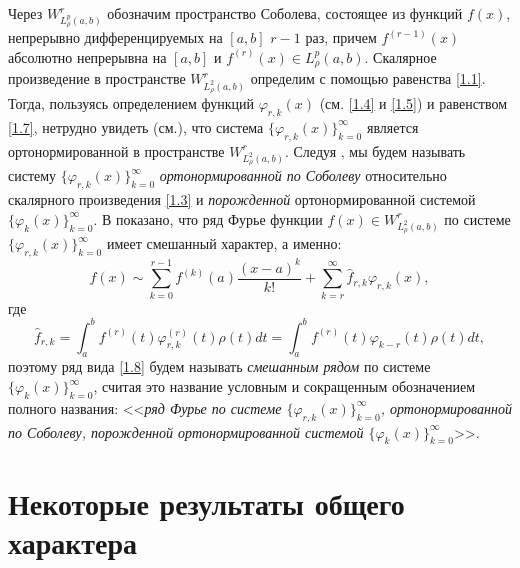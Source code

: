 Через $W^r_{L^p_\rho(a,b)}$ обозначим пространство Соболева, состоящее из функций $f(x)$, непрерывно дифференцируемых на $[a,b]$ $r-1$ раз, причем $f^{(r-1)}(x)$ абсолютно непрерывна на $[a,b]$  и $f^{(r)}(x)\in L^p_\rho(a,b)$.
Скалярное произведение в пространстве $W^r_{L^2_\rho(a,b)}$ определим с помощью равенства \eqref{1.1}. Тогда, пользуясь определением функций  $\varphi_{r,k}(x)$ (см. \eqref{1.4} и \eqref{1.5}) и равенством  \eqref{1.7}, нетрудно увидеть (см.\cite{Shar20}),  что система $\{\varphi_{r,k}(x)\}_{k=0}^\infty$ является ортонормированной в пространстве $W^r_{L^2_\rho(a,b)}$. Следуя \cite{Shar20}, мы будем называть систему $\{\varphi_{r,k}(x)\}_{k=0}^\infty$ \textit{ ортонормированной по Соболеву } относительно скалярного произведения \eqref{1.3} и  \textit{ порожденной} ортонормированной системой $\{\varphi_{k}(x)\}_{k=0}^\infty$.
В \cite{Shar20} показано,  что ряд Фурье функции $f(x)\in W^r_{L^2_\rho(a,b)}$ по системе  $\{\varphi_{r,k}(x)\}_{k=0}^\infty$ имеет смешанный характер, а именно:
  \begin{equation}\label{1.8}
f(x)\sim \sum_{k=0}^{r-1} f^{(k)}(a)\frac{(x-a)^k}{k!}+ \sum_{k=r}^\infty \hat f_{r,k}\varphi_{r,k}(x),
\end{equation}
где
  \begin{equation}\label{1.9}
 \hat f_{r,k}=\int_a^b f^{(r)}(t) \varphi^{(r)}_{r,k}(t)\rho(t)dt=\int_a^b f^{(r)}(t) \varphi_{k-r}(t)\rho(t)dt,
\end{equation}
поэтому ряд  вида \eqref{1.8} будем  называть \textit{ смешанным рядом} по  системе $\{\varphi_{k}(x)\}_{k=0}^\infty$, считая это название условным и сокращенным обозначением полного названия: <<\textit{ряд Фурье по системе  $\{\varphi_{r,k}(x)\}_{k=0}^\infty$, ортонормированной по Соболеву, порожденной ортонормированной системой $\{\varphi_{k}(x)\}_{k=0}^\infty$}>>.





\section{Некоторые результаты общего характера }

